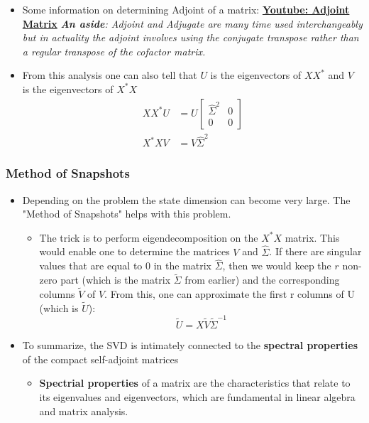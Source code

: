 \documentclass[11.5pt,a4paper]{article}
\begin{document}
\begin{itemize}
\begin{itemize}
        \textit{\textbf{What is Self Adjoint matrix?}(\href{https://en.wikipedia.org/wiki/Hermitian_matrix}{self-adjoint/Hermitian Matrix}): A self-adjoint matrix is one where $X = X^*$ or in the real space $X = X^T$.}
        \item Some information on determining Adjoint of a matrix: \href{https://www.youtube.com/watch?v=wjekhHnzL_U}{\textbf{Youtube: Adjoint Matrix}}\newline
        \textit{\textbf{An aside}: Adjoint and Adjugate are many time used interchangeably but in actuality the adjoint involves using the conjugate transpose rather than a regular transpose of the cofactor matrix.}
        \item From this analysis one can also tell that $U$ is the eigenvectors of $XX^*$ and $V$ is the eigenvectors of $X^*X$
        \begin{align*}
            XX^*U &= U\begin{bmatrix} \hat{\Sigma}^2 & 0 \\ 0 & 0\end{bmatrix}\\
            X^*XV &= V\hat{\Sigma}^2
        \end{align*}
    \end{itemize}
\end{itemize}

\subsubsection*{Method of Snapshots}

\begin{itemize}
    \item Depending on the problem the state dimension can become very large. The "Method of Snapshots" helps with this problem.
    \begin{itemize}
        \item The trick is to perform eigendecomposition on the $X^*X$ matrix. This would enable one to determine the matrices $V$ and $\hat{\Sigma}$. If there are singular values that are equal to 0 in the matrix $\hat{\Sigma}$, then we would keep the $r$ non-zero part (which is the matrix $\tilde{\Sigma}$ from earlier) and the corresponding columns $\tilde{V}$ of $V$. From this, one can approximate the first r columns of U (which is $\tilde{U}$):
        \begin{equation*}
            \tilde{U} = X\tilde{V}\tilde{\Sigma}^{-1}
        \end{equation*}
    \end{itemize}
    \item To summarize, the SVD is intimately connected to the \textbf{spectral properties} of the compact self-adjoint matrices
        \begin{itemize}
            \item \textbf{Spectrial properties} of a matrix are the characteristics that relate to its eigenvalues and eigenvectors, which are fundamental in linear algebra and matrix analysis. 
        \end{itemize}
\end{itemize}
\end{document}

